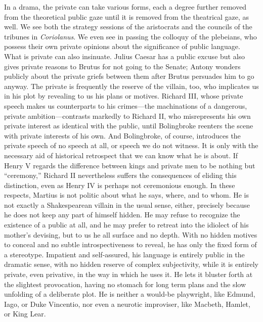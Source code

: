In a drama, the private can take various forms, each a degree further removed from the theoretical public gaze until it is removed from the theatrical gaze, as well.
We see both the strategy sessions of the aristocrats and the councils of the tribunes in \emph{Coriolanus}.
We even see in passing the colloquy of the plebeians, who possess their own private opinions about the significance of public language.
What is private can also insinuate.
Julius Caesar has a public excuse but also gives private reasons to Brutus for not going to the Senate; Antony wonders publicly about the private griefs between them after Brutus persuades him to go anyway.
The private is frequently the reserve of the villain, too, who implicates us in his plot by revealing to us his plans or motives.
Richard III, whose private speech makes us counterparts to his crimes---the machinations of a dangerous, private ambition---contrasts markedly to Richard II, who misrepresents his own private interest as identical with the public, until Bolingbroke reenters the scene with private interests of his own.
And Bolingbroke, of course, introduces the private speech of no speech at all, or speech we do not witness.
It is only with the necessary aid of historical retrospect that we can know what he is about.
If Henry V regards the difference between kings and private men to be nothing but ``ceremony,'' Richard II nevertheless suffers the consequences of eliding this distinction, even as Henry IV is perhaps not ceremonious enough.
In these respects, Martius is not politic about what he says, where, and to whom.
He is not exactly a Shakespearean villain in the usual sense, either, precisely because he does not keep any part of himself hidden.
He may refuse to recognize the existence of a public at all, and he may prefer to retreat into the idiolect of his mother's devising, but to us he all surface and no depth.
With no hidden motives to conceal and no subtle introspectiveness to reveal, he has only the fixed form of a stereotype.
Impatient and self-assured, his language is entirely public in the dramatic sense, with no hidden reserve of complex subjectivity, while it is entirely private, even privative, in the way in which he uses it.
He lets it bluster forth at the slightest provocation, having no stomach for long term plans and the slow unfolding of a deliberate plot.
He is neither a would-be playwright, like Edmund, Iago, or Duke Vincentio, nor even a neurotic improviser, like Macbeth, Hamlet, or King Lear.

